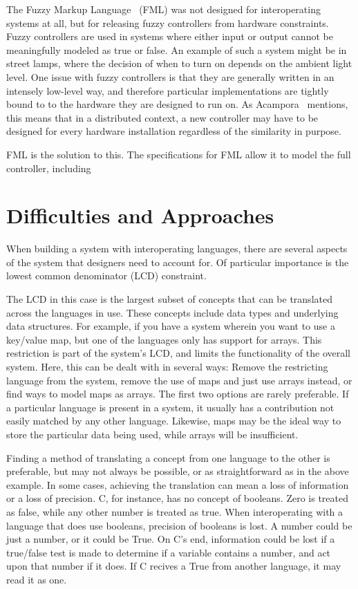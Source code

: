 \documentclass{sig-alternate}
\begin{document}
The Fuzzy Markup Language~\cite{Acampora:2013} (FML) was not designed for interoperating systems at all, but for releasing fuzzy controllers from hardware constraints.
Fuzzy controllers are used in systems where either input or output cannot be meaningfully modeled as true or false. An example of such a system might be in street lamps, where the decision of when to turn on depends on the ambient light level. One issue with fuzzy controllers is that they are generally written in an intensely low-level way, and therefore particular implementations are tightly bound to to the hardware they are designed to run on. As Acampora~\cite{Acampora:2013} mentions, this means that in a distributed context, a new controller may have to be designed for every hardware installation regardless of the similarity in purpose.

FML is the solution to this. The specifications for FML allow it to model the full controller, including 

\section{Difficulties and Approaches}\label{approaches}
When building a system with interoperating languages, there are several aspects of the system that designers need to account for. Of particular importance is the lowest common denominator (LCD) constraint.

The LCD in this case is the largest subset of concepts that can be translated across the languages in use. These concepts include data types and underlying data structures.
For example, if you have a system wherein you want to use a key/value map, but one of the languages only has support for arrays. This restriction is part of the system's LCD, and limits the functionality of the overall system. Here, this can be dealt with in several ways: Remove the restricting language from the system, remove the use of maps and just use arrays instead, or find ways to model maps as arrays. The first two options are rarely preferable. If a particular language is present in a system, it usually has a contribution not easily matched by any other language. Likewise, maps may be the ideal way to store the particular data being used, while arrays will be insufficient.

Finding a method of translating a concept from one language to the other is preferable, but may not always be possible, or as straightforward as in the above example. In some cases, achieving the translation can mean a loss of information or a loss of precision. C, for instance, has no concept of booleans. Zero is treated as false, while any other number is treated as true. When interoperating with a language that does use booleans, precision of booleans is lost. A number could be just a number, or it could be True. On C's end, information could be lost if a true/false test is made to determine if a variable contains a number, and act upon that number if it does. If C recives a True from another language, it may read it as one.
\end{document}
